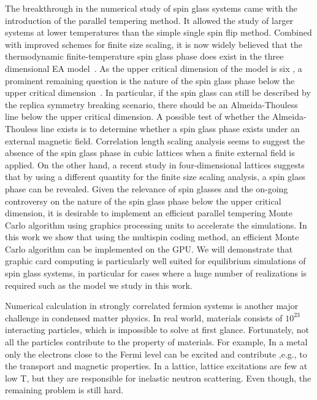 The breakthrough in the numerical study of spin glass systems came with the 
introduction of the parallel tempering method. It allowed the study of larger 
systems at lower temperatures than the simple single spin flip %
method. \cite{Swendsen-Wang-1986,Hukushima-Nemoto1996,Marinari-Parisi1992} 
Combined with improved schemes for finite size scaling, it is now widely 
believed that the thermodynamic finite-temperature spin glass phase does exist 
in the three dimensional EA model~\cite{Ballesteros2000}. As the upper critical 
dimension of the model is six \cite{Harris-Lubensky-Chen-1976,Tasaki-1989,
Green-Moore-Bray-1983}, a prominent remaining question is the nature of the 
spin glass phase below the upper critical dimension~\cite{Young-Katzgraber2004}.
In particular, if the spin glass can still be described by the replica symmetry 
breaking scenario, there should be an Almeida-Thouless line below the upper 
critical dimension. A possible test of whether the Almeida-Thouless 
line exists is to determine whether a spin glass phase exists under an external 
magnetic field. Correlation length scaling analysis seems to suggest the 
absence of the spin glass phase in cubic lattices when a finite external field 
is applied.\cite{Young-Katzgraber2004} On the other hand, a recent study in 
four-dimensional lattices suggests that by using a different quantity for the 
finite size scaling analysis, a spin glass phase can be revealed.
\cite{Banos2012} Given the relevance of spin glasses and the on-going 
controversy on the nature of the spin glass phase below the upper critical 
dimension, it is desirable to implement an efficient parallel tempering Monte 
Carlo algorithm using graphics processing units to accelerate the simulations. 
In this work we show that using the multispin coding method, 
\cite{Zorn1981337} an efficient Monte Carlo algorithm can be 
implemented on the GPU. We will demonstrate that graphic card computing is 
particularly well suited for equilibrium simulations of spin glass systems, 
in particular for cases where a huge number of realizations is required such as 
the model we study in this work. 

Numerical calculation in strongly correlated fermion systems is another major 
challenge in condensed matter physics. In real world, materials consists of 
$10^{23}$ interacting particles, which is impossible to solve at first glance. 
Fortunately, not all the particles contribute to the property of materials. For 
example, In a metal only the electrons close to the Fermi level can be excited 
and contribute ,e.g., to the transport and magnetic properties. In a lattice, 
lattice excitations are few at low T, but they are responsible for inelastic 
neutron scattering. Even though, the remaining problem is still hard. 

